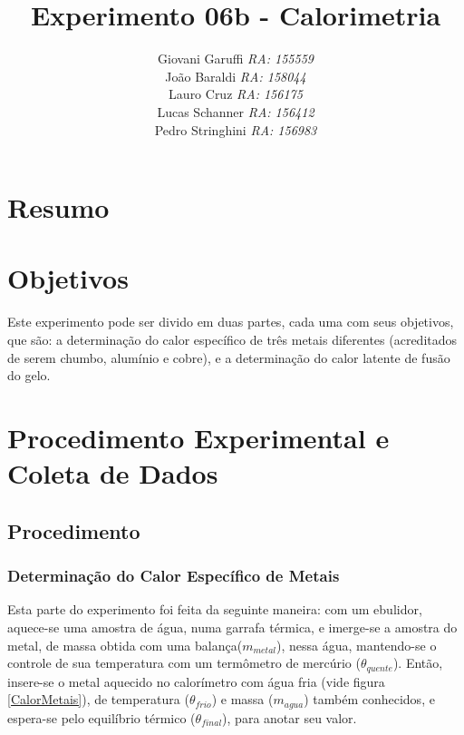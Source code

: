 \documentclass[12pt,a4paper]{article}
\begin{document}
\title{\vspace{70mm}\Huge Experimento 06b - Calorimetria}
\author{ Giovani Garuffi\qquad\hfill
		\textit {RA: 155559}\protect\\
		João Baraldi\hfill
		\textit{RA: 158044}\protect\\
		Lauro Cruz\hfill
		\textit{RA: 156175}\protect\\
		Lucas Schanner\hfill
		\textit{RA: 156412}\protect\\
		Pedro Stringhini\hfill
		\textit {RA: 156983}								
		}
\maketitle
\newpage
\section{Resumo}

\section{Objetivos}
Este experimento pode ser divido em duas partes, cada uma com seus objetivos, que são: a determinação do calor específico de três metais diferentes (acreditados de serem chumbo, alumínio e cobre), e a determinação do calor latente de fusão do gelo. 


\section{Procedimento Experimental e Coleta de Dados}


\subsection{Procedimento}


\subsubsection{Determinação do Calor Específico de Metais}

Esta parte do experimento foi feita da seguinte maneira: com um ebulidor, aquece-se uma amostra de água, numa garrafa térmica, e imerge-se a amostra do metal, de massa obtida com uma balança($m_{metal}$), nessa água, mantendo-se o controle de sua temperatura com um termômetro de mercúrio ($\theta_{quente}$). Então, insere-se o metal aquecido no calorímetro com água fria (vide figura \ref{CalorMetais}), de temperatura ($\theta_{frio}$) e massa ($m_{agua}$) também conhecidos, e espera-se pelo equilíbrio térmico ($\theta_{final}$), para anotar seu valor.
\end{document}

